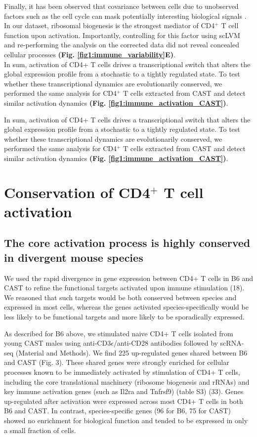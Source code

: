 Finally, it has been observed that covariance between cells due to unobserved factors such as the cell cycle can mask potentially interesting biological signals \citep{Stegle2015}. In our dataset, ribosomal biogenesis is the strongest mediator of CD4$^+$ T cell function upon activation. Importantly, controlling for this factor using scLVM \citep{Buettner2015} and re-performing the analysis on the corrected data did not reveal concealed cellular processes \textbf{(Fig. \ref{fig1:immune_variability}E)}.\\

In sum, activation of CD4+ T cells drives a transcriptional switch that alters the global expression profile from a stochastic to a tightly regulated state. To test whether these transcriptional dynamics are evolutionarily conserved, we performed the same analysis for CD4$^+$ T cells extracted from CAST and detect similar activation dynamics \textbf{(Fig. \ref{fig1:immune_activation_CAST})}.



In sum, activation of CD4+ T cells drives a transcriptional switch that alters the global expression profile from a stochastic to a tightly regulated state. To test whether these transcriptional dynamics are evolutionarily conserved, we performed the same analysis for CD4$^+$ T cells extracted from CAST and detect similar activation dynamics \textbf{(Fig. \ref{fig1:immune_activation_CAST})}.

\section{Conservation of CD4$^+$ T cell activation}
\subsection*{The core activation process is highly conserved in divergent mouse species}

We used the rapid divergence in gene expression between CD4+ T cells in B6 and CAST to refine the functional targets activated upon immune stimulation (18). We reasoned that such targets would be both conserved between species and expressed in most cells, whereas the genes activated species-specifically would be less likely to be functional targets and more likely to be sporadically expressed.

As described for B6 above, we stimulated naive CD4+ T cells isolated from young CAST males using anti-CD3$\epsilon$/anti-CD28 antibodies followed by scRNA-seq (Material and Methods). 
We find 225 up-regulated genes shared between B6 and CAST (Fig. 3). These shared genes were strongly enriched for cellular processes known to be immediately activated by stimulation of CD4+ T cells, including the core translational machinery (ribosome biogenesis and rRNAs) and key immune activation genes (such as Il2ra and Tnfrsf9) (table S3) (33). Genes up-regulated after activation were expressed across most CD4+ T cells in both B6 and CAST. In contrast, species-specific genes (96 for B6, 75 for CAST) showed no enrichment for biological function and tended to be expressed in only a small fraction of cells. 


